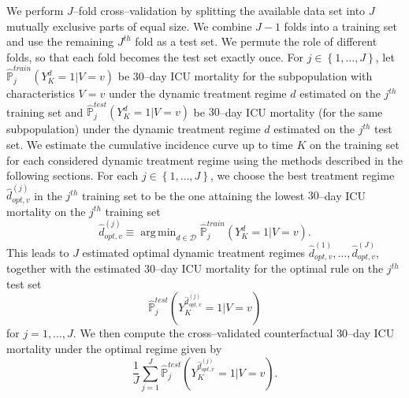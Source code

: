 \documentclass[12pt]{article}
\DeclareMathOperator*{\argmin}{arg\,min}
\begin{document}
We perform $J$--fold cross--validation by splitting the available data set into $J$ mutually exclusive parts of equal size. We combine $J-1$ folds into a training set and use the remaining $J^{th}$ fold as a test set. We permute the role of different folds, so that each fold becomes the test set exactly once. For $j \in \left\lbrace 1, \dots, J \right\rbrace$, let $\hat{\mathbb{P}}_{j}^{train} \left( Y_{K}^d = 1 \vert V = v \right)$ be $30$--day ICU mortality for the subpopulation with characteristics $V=v$ under the dynamic treatment regime $d$ estimated on the $j^{th}$ training set and $\hat{\mathbb{P}}_{j}^{test} \left( Y_{K}^d = 1 \vert  V = v \right)$ be $30$--day ICU mortality (for the same subpopulation) under the dynamic treatment regime $d$ estimated on the $j^{th}$ test set. We estimate the cumulative incidence curve up to time $K$ on the training set for each considered dynamic treatment regime using the methods described in the following sections. For each $j \in \left\lbrace 1, \dots, J \right\rbrace$, we choose the best treatment regime $\hat{d}_{opt, v}^{(j)}$ in the $j^{th}$ training set to be the one attaining the lowest $30$--day ICU mortality on the $j^{th}$ training set
\begin{equation*}
\hat{d}_{opt, v}^{(j)} \equiv \argmin_{d \in \mathcal{D}} \hat{\mathbb{P}}_{j}^{train} \left( Y_{K}^d = 1 \vert  V = v \right).
\end{equation*}
This leads to $J$ estimated optimal dynamic treatment regimes $\hat{d}_{opt, v}^{(1)}, \dots, \hat{d}_{opt, v}^{(J)}$, together with the estimated $30$--day ICU mortality for the optimal rule on the $j^{th}$ test set
\begin{equation*}
\hat{\mathbb{P}}_{j}^{test} \left( Y_{K}^{\hat{d}_{opt, v}^{(j)}} = 1 \vert  V = v \right)
\end{equation*} 
for $j = 1, \dots, J$. We then compute the cross--validated counterfactual $30$--day ICU mortality under the optimal regime given by
\begin{equation}
\label{eqn4}
\frac{1}{J} \sum_{j=1}^J \hat{\mathbb{P}}_{j}^{test} \left( Y_{K}^{\hat{d}_{opt, v}^{(j)}} = 1 \vert  V = v \right).
\end{equation}
\end{document}
